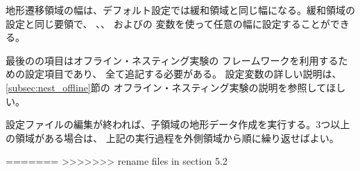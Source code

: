 地形遷移領域の幅は、デフォルト設定では緩和領域と同じ幅になる。緩和領域の設定と同じ要領で、
、、
およびの
変数を使って任意の幅に設定することができる。

最後のの項目はオフライン・ネスティング実験の
フレームワークを利用するための設定項目であり、
全て追記する必要がある。
設定変数の詳しい説明は、\ref{subsec:nest_offline}節の
オフライン・ネスティング実験の説明を参照してほしい。

設定ファイルの編集が終われば、子領域の地形データ作成を実行する。3つ以上の領域がある場合は、
上記の実行過程を外側領域から順に繰り返せばよい。


=======
>>>>>>> rename files in section 5.2

